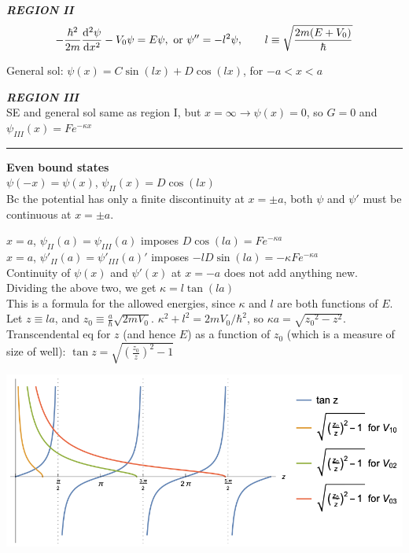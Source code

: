\smallskip

\textbf{\textit{REGION II}} \\
$$-\frac{\hbar^2}{2m} \dv[2]{\psi}{x} - V_0 \psi = E \psi, \textrm{ or } \psi'' = -l^2 \psi, \qquad l \equiv \sqrt{\frac{2m (E + V_0)}{\hbar}}$$

General sol: $\psi(x) = C \sin(lx) + D \cos(lx)$, for $-a < x < a$

\smallskip

\textbf{\textit{REGION III}} \\
SE and general sol same as region I, but $x = \infty \rightarrow \psi(x) = 0$, so $G=0$ and $\psi_{III}(x) = Fe^{-\kappa x}$

\medskip
\hrule height 0.3pt \thinspace

\textbf{Even bound states} \\
$\psi(-x) = \psi(x)$, $\psi_{II}(x) = D \cos(lx)$ \\
Bc the potential has only a finite discontinuity at $x = \pm a$, both $\psi$ and $\psi'$ must be continuous at $x = \pm a$.

$x = a$, $\psi_{II}(a) = \psi_{III}(a)$ imposes $D \cos(la) = F e^{-\kappa a}$ \\

$x = a$, $\psi'_{II}(a) = \psi'_{III}(a)'$ imposes $-lD \sin(la) = -\kappa F e^{-\kappa a}$ \\

Continuity of $\psi(x)$ and $\psi'(x)$ at $x = -a$ does not add anything new. \\

Dividing the above two, we get $\kappa = l \tan(la)$ \\
This is a formula for the allowed energies, since $\kappa$ and $l$ are both functions of $E$. Let $z \equiv la$, and $z_0 \equiv \frac{a}{\hbar} \sqrt{2m V_0}$. $\kappa^2 + l^2 = 2m V_0 / \hbar^2$, so $\kappa a = \sqrt{{z_0}^2 - z^2}$. \\

Transcendental eq for $z$ (and hence $E$) as a function of $z_0$ (which is a measure of size of well): $\tan z = \sqrt{(\frac{z_0}{z})^2 - 1}$

\vspace{0em}
\begin{Figure}
    \raggedright
    \includegraphics[width=0.6\columnwidth]{figures/even_finite_square_well.png}
\end{Figure}
\vspace{0em}

